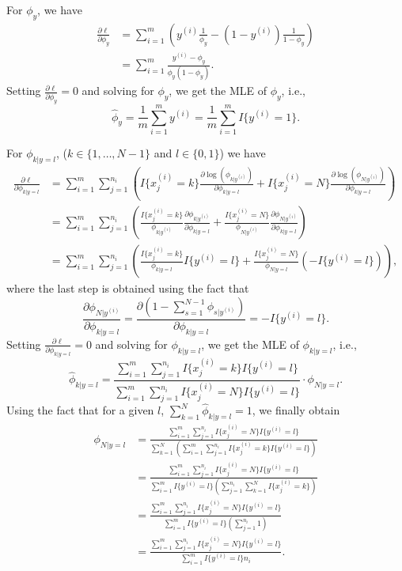 \documentclass{article}
\begin{document}
For $\phi_y$, we have
\[
\begin{split}
\frac{\partial{\ell}}{\partial{\phi_y}}%
&=\sum_{i=1}^m\left(y^{(i)}\frac{1}{\phi_y}-(1-y^{(i)})\frac{1}{1-\phi_y}\right)\\%
&=\sum_{i=1}^m\frac{y^{(i)}-\phi_y}{\phi_y(1-\phi_y)}.
\end{split}
\]
Setting $\frac{\partial{\ell}}{\partial{\phi_y}}=0$ and solving for $\phi_y$, we get the MLE of $\phi_y$, i.e.,
\[
\hat{\phi}_y=\frac{1}{m}\sum_{i=1}^{m}y^{(i)}=\frac{1}{m}\sum_{i=1}^{m}I\{y^{(i)}=1\}.
\]

For $\phi_{k|y=l}$, ($k\in{\{1,\ldots,N-1\}}$ and $l\in{\{0,1\}}$) we have
\[
\begin{split}
\frac{\partial{\ell}}{\partial{\phi_{k|y=l}}}%
&=\sum_{i=1}^m\sum_{j=1}^{n_i}\left(I\{x_j^{(i)}=k\}\frac{\partial{\log(\phi_{k|y^{(i)}})}}{\partial{\phi_{k|y=l}}}%
+I\{x_j^{(i)}=N\}\frac{\partial{\log(\phi_{N|y^{(i)}})}}{\partial{\phi_{k|y=l}}}\right)\\
&=\sum_{i=1}^m\sum_{j=1}^{n_i}\left(\frac{I\{x_j^{(i)}=k\}}{\phi_{k|y^{(i)}}}\frac{\partial{\phi_{k|y^{(i)}}}}{\partial{\phi_{k|y=l}}}%
+\frac{I\{x_j^{(i)}=N\}}{\phi_{N|y^{(i)}}}\frac{\partial{\phi_{N|y^{(i)}}}}{\partial{\phi_{k|y=l}}}\right)\\
&=\sum_{i=1}^m\sum_{j=1}^{n_i}\left(\frac{I\{x_j^{(i)}=k\}}{\phi_{k|y=l}}I\{y^{(i)}=l\}%
+\frac{I\{x_j^{(i)}=N\}}{\phi_{N|y=l}}\left(-I\{y^{(i)}=l\}\right)\right),
\end{split}
\]
where the last step is obtained using the fact that
\[
\frac{\partial{\phi_{N|y^{(i)}}}}{\partial{\phi_{k|y=l}}}=\frac{\partial{(1-\sum_{s=1}^{N-1}\phi_{s|y^{(i)}})}}{\partial{\phi_{k|y=l}}}=-I\{y^{(i)}=l\}.
\]
Setting $\frac{\partial{\ell}}{\partial{\phi_{k|y=l}}}=0$ and solving for $\phi_{k|y=l}$, we get the MLE of $\phi_{k|y=l}$, i.e.,
\[
\hat{\phi}_{k|y=l}=\frac{\sum_{i=1}^m\sum_{j=1}^{n_i}I\{x_j^{(i)}=k\}I\{y^{(i)}=l\}}{\sum_{i=1}^m\sum_{j=1}^{n_i}I\{x_j^{(i)}=N\}I\{y^{(i)}=l\}}\cdot\phi_{N|y=l}.
\]
Using the fact that for a given $l$, $\sum_{k=1}^{N}\hat{\phi}_{k|y=l}=1$, we finally obtain
\[
\begin{split}
\phi_{N|y=l}
&=\frac{\sum_{i=1}^m\sum_{j=1}^{n_i}I\{x_j^{(i)}=N\}I\{y^{(i)}=l\}}{\sum_{k=1}^{N}\left(\sum_{i=1}^m\sum_{j=1}^{n_i}I\{x_j^{(i)}=k\}I\{y^{(i)}=l\}\right)}\\
&=\frac{\sum_{i=1}^m\sum_{j=1}^{n_i}I\{x_j^{(i)}=N\}I\{y^{(i)}=l\}}{\sum_{i=1}^m I\{y^{(i)}=l\}\left(\sum_{j=1}^{n_i}\sum_{k=1}^{N}I\{x_j^{(i)}=k\}\right)}\\
&=\frac{\sum_{i=1}^m\sum_{j=1}^{n_i}I\{x_j^{(i)}=N\}I\{y^{(i)}=l\}}{\sum_{i=1}^m I\{y^{(i)}=l\}\left(\sum_{j=1}^{n_i}1\right)}\\
&=\frac{\sum_{i=1}^m\sum_{j=1}^{n_i}I\{x_j^{(i)}=N\}I\{y^{(i)}=l\}}{\sum_{i=1}^m I\{y^{(i)}=l\}n_i}.
\end{split}
\]
\end{document}
